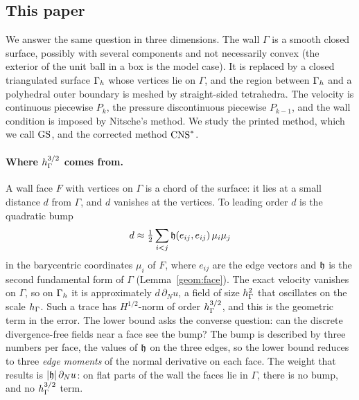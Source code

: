 \subsection{This paper}
We answer the same question in three dimensions. The wall $\Gamma$ is a smooth closed surface, possibly with several components and not necessarily convex (the exterior of the unit ball in a box is the model case). It is replaced by a closed triangulated surface $\Gamma_h$ whose vertices lie on $\Gamma$, and the region between $\Gamma_h$ and a polyhedral outer boundary is meshed by straight-sided tetrahedra. The velocity is continuous piecewise $P_k$, the pressure discontinuous piecewise $P_{k-1}$, and the wall condition is imposed by Nitsche's method. We study the printed method, which we call $\mathrm{GS}$, and the corrected method $\mathrm{CNS}^\ast$.

\paragraph{Where $h_\Gamma^{3/2}$ comes from.} A wall face $F$ with vertices on $\Gamma$ is a chord of the surface: it lies at a small distance $d$ from $\Gamma$, and $d$ vanishes at the vertices. To leading order $d$ is the quadratic bump
\[
d\approx\tfrac12\sum_{i<j}\mathfrak h(e_{ij},e_{ij})\,\mu_i\mu_j
\]
in the barycentric coordinates $\mu_i$ of $F$, where $e_{ij}$ are the edge vectors and $\mathfrak h$ is the second fundamental form of $\Gamma$ (Lemma~\ref{geom:face}). The exact velocity vanishes on $\Gamma$, so on $\Gamma_h$ it is approximately $d\,\partial_Nu$, a field of size $h_\Gamma^2$ that oscillates on the scale $h_\Gamma$. Such a trace has $H^{1/2}$-norm of order $h_\Gamma^{3/2}$, and this is the geometric term in the error. The lower bound asks the converse question: can the discrete divergence-free fields near a face see the bump? The bump is described by three numbers per face, the values of $\mathfrak h$ on the three edges, so the lower bound reduces to three \emph{edge moments} of the normal derivative on each face. The weight that results is $|\mathfrak h|\,\partial_Nu$: on flat parts of the wall the faces lie in $\Gamma$, there is no bump, and no $h_\Gamma^{3/2}$ term.

